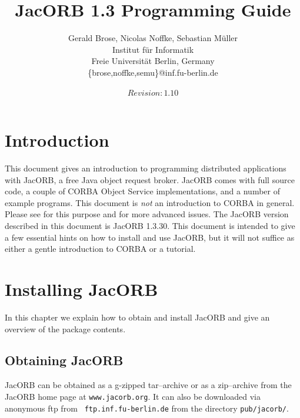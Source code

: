 \documentclass[12pt]{scrbook}
\title{JacORB 1.3 Programming Guide}
\author{Gerald Brose, Nicolas Noffke, Sebastian M\"uller\\
Institut f\"ur Informatik\\
Freie Universit\"at Berlin, Germany\\
\{brose,noffke,semu\}@inf.fu-berlin.de\\
\\
$Revision: 1.10 $
}
\begin{document}
\newcommand{\cmdline}[1]{\begin{small}\noindent \texttt{\$ #1}\end{small}}

\newcommand{\JacORBDir}{JacORB1\_3\_30}
\newcommand{\JacORBVersion}{1.3.30}

\maketitle


\setlength{\parskip}{1.1ex}
\newpage
\tableofcontents

\chapter{Introduction}

This  document  gives   an  introduction  to  programming  distributed
applications with  JacORB, a free  Java object request  broker. JacORB
comes  with  full  source  code,  a couple  of  CORBA  Object  Service
implementations, and  a number of example programs.   This document is
{\it  not}   an  introduction  to   CORBA  in  general.    Please  see
\cite{Brose2001a,Siegel2000,   Vinoski1997}  for   this   purpose  and
\cite{Henning1999}  for  more  advanced  issues.  The  JacORB  version
described in this document  is JacORB \JacORBVersion. This document is
intended  to give  a few  essential hints  on how  to install  and use
JacORB, but  it will  not suffice as  either a gentle  introduction to
CORBA or a tutorial.


\chapter{Installing JacORB}
\label{Ch_installing}

In this chapter  we explain how to obtain and  install JacORB and give
an overview of the package contents.

\section{Obtaining JacORB}

JacORB can be obtained as a g-zipped tar--archive or as a zip--archive
from the  JacORB home page  at {\tt www.jacorb.org}.
It   can   also   be   downloaded   via  anonymous   ftp   from   {\tt
ftp.inf.fu-berlin.de} from the directory {\tt pub/jacorb/}.
\end{document}
